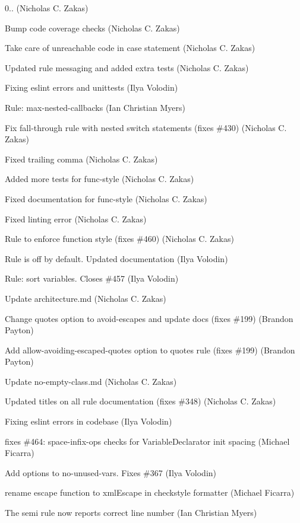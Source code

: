 \begin{DoxyItemize}
\item 0.. (Nicholas C. Zakas)
\item Bump code coverage checks (Nicholas C. Zakas)
\item Take care of unreachable code in case statement (Nicholas C. Zakas)
\item Updated rule messaging and added extra tests (Nicholas C. Zakas)
\item Fixing eslint errors and unittests (Ilya Volodin)
\item Rule\+: max-\/nested-\/callbacks (Ian Christian Myers)
\item Fix fall-\/through rule with nested switch statements (fixes \#430) (Nicholas C. Zakas)
\item Fixed trailing comma (Nicholas C. Zakas)
\item Added more tests for func-\/style (Nicholas C. Zakas)
\item Fixed documentation for func-\/style (Nicholas C. Zakas)
\item Fixed linting error (Nicholas C. Zakas)
\item Rule to enforce function style (fixes \#460) (Nicholas C. Zakas)
\item Rule is off by default. Updated documentation (Ilya Volodin)
\item Rule\+: sort variables. Closes \#457 (Ilya Volodin)
\item Update architecture.\+md (Nicholas C. Zakas)
\item Change quotes option to avoid-\/escapes and update docs (fixes \#199) (Brandon Payton)
\item Add allow-\/avoiding-\/escaped-\/quotes option to quotes rule (fixes \#199) (Brandon Payton)
\item Update no-\/empty-\/class.\+md (Nicholas C. Zakas)
\item Updated titles on all rule documentation (fixes \#348) (Nicholas C. Zakas)
\item Fixing eslint errors in codebase (Ilya Volodin)
\item fixes \#464\+: space-\/infix-\/ops checks for Variable\+Declarator init spacing (Michael Ficarra)
\item Add options to no-\/unused-\/vars. Fixes \#367 (Ilya Volodin)
\item rename escape function to xml\+Escape in checkstyle formatter (Michael Ficarra)
\item The semi rule now reports correct line number (Ian Christian Myers)

\end{DoxyItemize}
